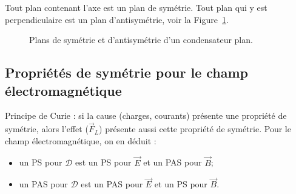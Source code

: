         \begin{example}
            Tout plan contenant l'axe est un plan de symétrie. Tout plan qui y est perpendiculaire est un plan d'antisymétrie, voir la Figure~\ref{fig:plan_symetrie_condensateur_plan_armatures_circulaire}.
            \begin{figure}
                \centering
                \caption{Plans de symétrie et d'antisymétrie d'un condensateur plan.}    
                \label{fig:plan_symetrie_condensateur_plan_armatures_circulaire}
            \end{figure} 
        \end{example}

    \subsection{Propriétés de symétrie pour le champ électromagnétique}

        Principe de Curie : si la cause (charges, courants) présente une propriété de symétrie, alors l'effet ($\vec{F}_L$) présente aussi cette propriété de symétrie. Pour le champ électromagnétique, on en déduit :
        \begin{itemize}
            \item un PS pour $\mathcal{D}$ est un PS pour $\vec{E}$ et un PAS pour $\vec{B}$;
            \item un PAS pour $\mathcal{D}$ est un PAS pour $\vec{E}$ et un PS pour $\vec{B}$.
        \end{itemize}

